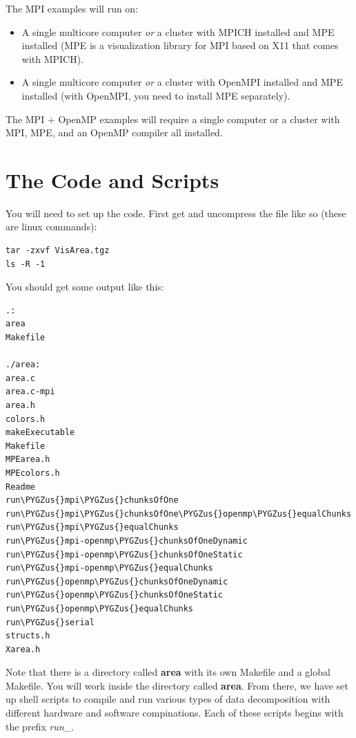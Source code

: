 \documentclass[letterpaper,10pt,openany,oneside]{sphinxmanual}
\def\PYGZus{\char`\_}
\begin{document}
The MPI examples will run on:
\begin{itemize}
\item {} 
A single multicore computer \emph{or} a cluster with MPICH installed and MPE installed (MPE is a visualization library for MPI based on X11 that comes with MPICH).

\item {} 
A single multicore computer \emph{or} a cluster with OpenMPI installed and MPE installed (with OpenMPI, you need to install MPE separately).

\end{itemize}

The MPI + OpenMP examples will require a single computer or a cluster with MPI, MPE, and an OpenMP compiler all installed.


\section{The Code and Scripts}
\label{Code_Serial:the-code-and-scripts}
You will need to set up the code. First get and uncompress the  file like so (these are linux commands):

\begin{Verbatim}[commandchars=\\\{\}]
tar -zxvf VisArea.tgz
ls -R -1
\end{Verbatim}

You should get some output like this:

\begin{Verbatim}[commandchars=\\\{\}]
.:
area
Makefile

./area:
area.c
area.c-mpi
area.h
colors.h
makeExecutable
Makefile
MPEarea.h
MPEcolors.h
Readme
run\PYGZus{}mpi\PYGZus{}chunksOfOne
run\PYGZus{}mpi\PYGZus{}chunksOfOne\PYGZus{}openmp\PYGZus{}equalChunks
run\PYGZus{}mpi\PYGZus{}equalChunks
run\PYGZus{}mpi-openmp\PYGZus{}chunksOfOneDynamic
run\PYGZus{}mpi-openmp\PYGZus{}chunksOfOneStatic
run\PYGZus{}mpi-openmp\PYGZus{}equalChunks
run\PYGZus{}openmp\PYGZus{}chunksOfOneDynamic
run\PYGZus{}openmp\PYGZus{}chunksOfOneStatic
run\PYGZus{}openmp\PYGZus{}equalChunks
run\PYGZus{}serial
structs.h
Xarea.h
\end{Verbatim}

Note that there is a directory called \textbf{area} with its own Makefile and a global Makefile.  You will work inside the directory called \textbf{area}.  From there, we have set up shell scripts to compile and run various types of data decomposition with different hardware and software compinations. Each of these scripts begins with the prefix \emph{run\_}.
\end{document}
